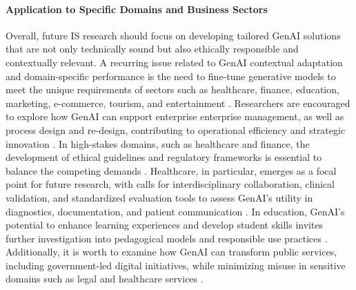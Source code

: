 \paragraph{Application to Specific Domains and Business Sectors}
Overall, future IS research should focus on developing tailored GenAI solutions that are not only technically sound but also ethically responsible and contextually relevant. A recurring issue related to GenAI contextual adaptation and domain-specific performance is the need to fine-tune generative models to meet the unique requirements of sectors such as healthcare, finance, education, marketing, e-commerce, tourism, and entertainment \parencite{R01, R02, R04, R07, R08}. Researchers are encouraged to explore how GenAI can support enterprise enterprise management, as well as process design and re-design, contributing to operational efficiency and strategic innovation \parencite{R04}. In high-stakes domains, such as healthcare and finance, the development of ethical guidelines and regulatory frameworks is essential to balance the competing demands \parencite{R01, R09}.
Healthcare, in particular, emerges as a focal point for future research, with calls for interdisciplinary collaboration, clinical validation, and standardized evaluation tools to assess GenAI’s utility in diagnostics, documentation, and patient communication \parencite{S01, S02, S03, S05, S11, S16}. In education, GenAI’s potential to enhance learning experiences and develop student skills invites further investigation into pedagogical models and responsible use practices \parencite{R08, S14}. Additionally, it is worth to examine how GenAI can transform public services, including government-led digital initiatives, while minimizing misuse in sensitive domains such as legal and healthcare services \parencite{R08}.


